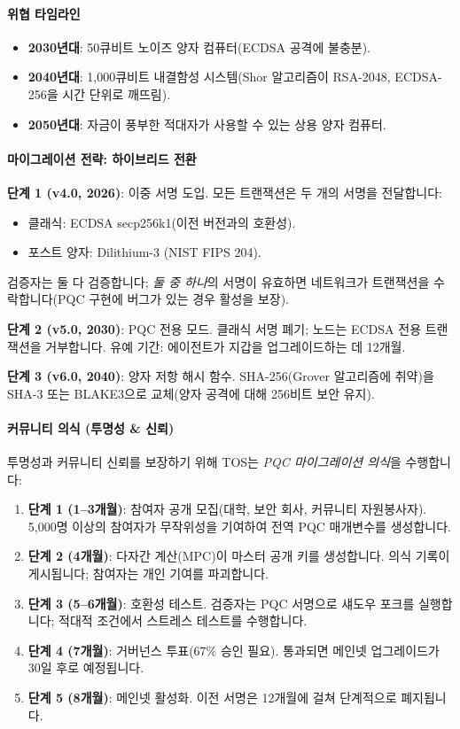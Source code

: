 \documentclass[11pt]{article}
\begin{document}
\paragraph{위협 타임라인}
\begin{itemize}[noitemsep]
  \item \textbf{2030년대}: 50큐비트 노이즈 양자 컴퓨터(ECDSA 공격에 불충분).
  \item \textbf{2040년대}: 1,000큐비트 내결함성 시스템(Shor 알고리즘이 RSA-2048, ECDSA-256을 시간 단위로 깨뜨림).
  \item \textbf{2050년대}: 자금이 풍부한 적대자가 사용할 수 있는 상용 양자 컴퓨터.
\end{itemize}

\paragraph{마이그레이션 전략: 하이브리드 전환}
\textbf{단계 1 (v4.0, 2026)}: 이중 서명 도입. 모든 트랜잭션은 두 개의 서명을 전달합니다:
\begin{itemize}[noitemsep]
  \item 클래식: ECDSA secp256k1(이전 버전과의 호환성).
  \item 포스트 양자: Dilithium-3 (NIST FIPS 204).
\end{itemize}
검증자는 둘 다 검증합니다; \emph{둘 중 하나}의 서명이 유효하면 네트워크가 트랜잭션을 수락합니다(PQC 구현에 버그가 있는 경우 활성을 보장).

\textbf{단계 2 (v5.0, 2030)}: PQC 전용 모드. 클래식 서명 폐기; 노드는 ECDSA 전용 트랜잭션을 거부합니다. 유예 기간: 에이전트가 지갑을 업그레이드하는 데 12개월.

\textbf{단계 3 (v6.0, 2040)}: 양자 저항 해시 함수. SHA-256(Grover 알고리즘에 취약)을 SHA-3 또는 BLAKE3으로 교체(양자 공격에 대해 256비트 보안 유지).

\paragraph{커뮤니티 의식 (투명성 \& 신뢰)}
투명성과 커뮤니티 신뢰를 보장하기 위해 TOS는 \emph{PQC 마이그레이션 의식}을 수행합니다:
\begin{enumerate}[noitemsep]
  \item \textbf{단계 1 (1--3개월)}: 참여자 공개 모집(대학, 보안 회사, 커뮤니티 자원봉사자). 5,000명 이상의 참여자가 무작위성을 기여하여 전역 PQC 매개변수를 생성합니다.
  \item \textbf{단계 2 (4개월)}: 다자간 계산(MPC)이 마스터 공개 키를 생성합니다. 의식 기록이 게시됩니다; 참여자는 개인 기여를 파괴합니다.
  \item \textbf{단계 3 (5--6개월)}: 호환성 테스트. 검증자는 PQC 서명으로 섀도우 포크를 실행합니다; 적대적 조건에서 스트레스 테스트를 수행합니다.
  \item \textbf{단계 4 (7개월)}: 거버넌스 투표(67\% 승인 필요). 통과되면 메인넷 업그레이드가 30일 후로 예정됩니다.
  \item \textbf{단계 5 (8개월)}: 메인넷 활성화. 이전 서명은 12개월에 걸쳐 단계적으로 폐지됩니다.
\end{enumerate}
\end{document}
